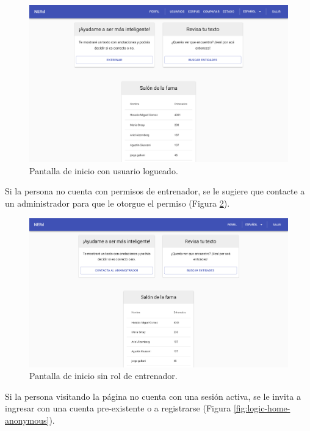 \documentclass[12pt,a4paper,]{scrartcl}
\begin{document}
\begin{figure}[H]

{\centering \includegraphics{assets/logic/home-logged-all.pdf} 

}

\caption{Pantalla de inicio con usuario logueado.}\label{fig:logic-home}
\end{figure}

Si la persona no cuenta con permisos de entrenador, se le sugiere que contacte a un administrador para que le otorgue el permiso (Figura \ref{fig:logic-home-logged-nontrainer}).

\begin{figure}[H]

{\centering \includegraphics{assets/logic/home-logged-not_trainer.pdf} 

}

\caption{Pantalla de inicio sin rol de entrenador.}\label{fig:logic-home-logged-nontrainer}
\end{figure}

Si la persona visitando la página no cuenta con una sesión activa, se le invita a ingresar con una cuenta pre-existente o a registrarse (Figura \ref{fig:logic-home-anonymous}).
\end{document}
